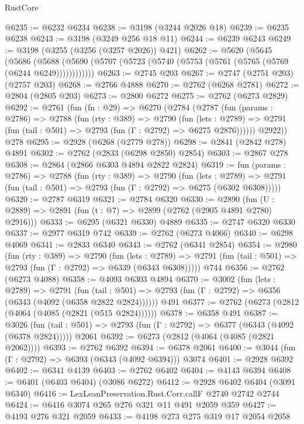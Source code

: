 \begin{lexlean}{RustCore}
\begin{coremodule}
@6235 := @6232 @6234
@6238 := @3198 (@3244 @2026 @18)
@6239 := @6235 @6238
@6243 := @3198 (@3249 @256 @18 @11)
@6244 := @6239 @6243
@6249 := @3198 (@3255 (@3256 (@3257 @2026)) @421)
@6262 := @5620
    (@5645
      (@5686 (@5688 (@5690 (@5707 (@5723 (@5740 (@5753 (@5761 (@5765 (@5769 (@6244 @6249))))))))))))
@6263 := @2745 @203
@6267 := @2747 (@2751 @203) (@2757 @203)
@6268 := @2766 @4888
@6270 := @2762 (@6268 @2781)
@6272 := @2804 (@2805 @203)
@6273 := @2800 @6272
@6275 := @2762 (@6273 @2829)
@6292 := @2761
    (fun (fn : @29) =>
    @6270
      (@2784
        (@2787
          (fun (params : @2786) =>
          @2788
            (fun (rty : @389) =>
            @2790
              (fun (lets : @2789) =>
              @2791 (fun (tail : @501) => @2793 (fun (Γ : @2792) => @6275 @2876))))))
        @2922))
    @278
@6295 := @2928 (@6268 (@2779 @278))
@6298 := @2841 (@2842 @278) @4891
@6302 := @2762 (@2833 (@6298 @2850) @2854)
@6303 := @2867 @278
@6308 := @2864 (@2866 @6303 @4894 @2822 @2824)
@6319 := fun (params : @2786) =>
  @2788
    (fun (rty : @389) =>
    @2790
      (fun (lets : @2789) =>
      @2791 (fun (tail : @501) => @2793 (fun (Γ : @2792) => @6275 (@6302 @6308)))))
@6320 := @2787 @6319
@6321 := @2784 @6320
@6330 := @2890 (fun (U : @2889) => @2891 (fun (t : @7) => @2899 (@2762 (@2905 @4891 @2780) @2916)))
@6333 := @6295 (@6321 @6330) @4889
@6335 := @2747 @6320 @6330
@6337 := @2977 @6319 @742
@6339 := @2762 (@6273 @4066)
@6340 := @6298 @4069
@6341 := @2833 @6340
@6343 := @2762 (@6341 @2854)
@6354 := @2980
    (fun (rty : @389) =>
    @2790
      (fun (lets : @2789) =>
      @2791 (fun (tail : @501) => @2793 (fun (Γ : @2792) => @6339 (@6343 @6308)))))
    @744
@6356 := @2762 (@6273 @4088)
@6358 := @4093 @6303 @4894
@6370 := @3002
    (fun (lets : @2789) =>
    @2791
      (fun (tail : @501) => @2793 (fun (Γ : @2792) => @6356 (@6343 (@4092 (@6358 @2822 @2824))))))
    @491
@6377 := @2762 (@6273 (@2812 (@4064 (@4085 (@2821 (@515 @2824))))))
@6378 := @6358 @491
@6387 := @3026
    (fun (tail : @501) => @2793 (fun (Γ : @2792) => @6377 (@6343 (@4092 (@6378 @2824)))))
    @2061
@6392 := @6273 (@2812 (@4064 (@4085 (@2821 @2062))))
@6393 := @2762 @6392
@6394 := @6378 @2061
@6400 := @3044 (fun (Γ : @2792) => @6393 (@6343 (@4092 @6394))) @3074
@6401 := @2928 @6392
@6402 := @6341 @4139
@6403 := @2762 @6402
@6404 := @4143 @6394
@6408 := @6401 (@6403 @6404) (@3086 @6272)
@6412 := @2928 @6402 @6404 (@3091 @6340)
@6416 := LexLeanPreservation.Rust.Corr.callF @2740 @2742 @2744
@6424 := @6416 @3074 @265 @276 @321 @11 @491 @2059 @359
@6427 := @4193 @276 @321 @2059
@6433 := @4198 @273 @275 @319 @17 @2054 @2058

\end{coremodule}
\end{lexlean}

